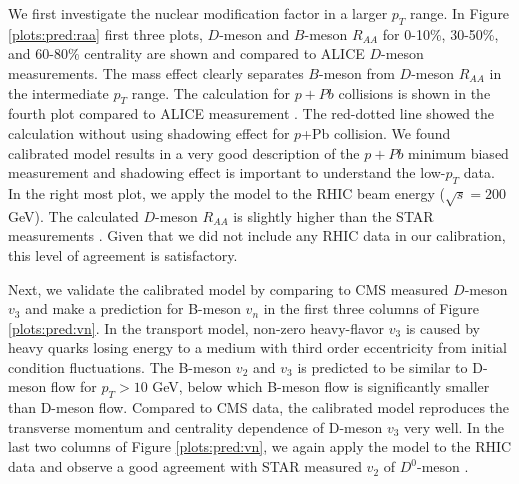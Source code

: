 \documentclass[aps, prc, reprint, amsmath, groupedaddress, nofootinbib]{revtex4-1}
\begin{document}
We first investigate the nuclear modification factor in a larger $p_T$ range.
In Figure \ref{plots:pred:raa} first three plots, $D$-meson and $B$-meson $R_{AA}$ for 0-10\%, 30-50\%, and 60-80\% centrality are shown and compared to ALICE $D$-meson measurements.
The mass effect clearly separates $B$-meson from $D$-meson $R_{AA}$ in the intermediate $p_T$ range. 
The calculation for $p+Pb$ collisions is shown in the fourth plot compared to ALICE measurement \cite{Abelev:2014hha}.
The red-dotted line showed the calculation without using shadowing effect for $p$+Pb collision.
We found calibrated model results in a very good description of the $p+Pb$ minimum biased measurement and shadowing effect is important to understand the low-$p_T$ data.
In the right most plot, we apply the model to the RHIC beam energy ($\sqrt{s} = 200$ GeV).
The calculated $D$-meson $R_{AA}$ is slightly higher than the STAR measurements \cite{Xie:2016iwq}. 
Given that we did not include any RHIC data in our calibration, this level of agreement is satisfactory.

Next, we validate the calibrated model by comparing to CMS measured $D$-meson $v_3$ and make a prediction for B-meson $v_n$ in the first three columns of Figure \ref{plots:pred:vn}.
In the transport model, non-zero heavy-flavor $v_3$ is caused by heavy quarks losing energy to a medium with third order eccentricity from initial condition fluctuations.
The B-meson $v_2$ and $v_3$ is predicted to be similar to D-meson flow for $p_T > 10$ GeV, below which B-meson flow is significantly smaller than D-meson flow.
Compared to CMS data, the calibrated model reproduces the transverse momentum and centrality dependence of D-meson $v_3$ very well.
In the last two columns of Figure \ref{plots:pred:vn}, we again apply the model to the RHIC data and observe a good agreement with STAR measured $v_2$ of $D^0$-meson \cite{Adamczyk:2017xur}.
\end{document}
